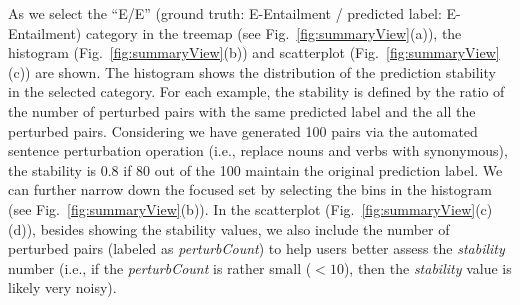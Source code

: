 As we select the ``E/E'' (ground truth: E-Entailment / predicted label: E-Entailment) category in the treemap (see Fig.~\ref{fig:summaryView}(a)), the histogram (Fig.~\ref{fig:summaryView}(b)) and scatterplot  (Fig.~\ref{fig:summaryView}(c)) are shown. The histogram shows the distribution of the prediction stability in the selected category. For each example, the stability is defined by the ratio of the number of perturbed pairs with the same predicted label and the all the perturbed pairs. Considering we have generated 100 pairs via the automated sentence perturbation operation (i.e., replace nouns and verbs with synonymous), the stability is 0.8 if 80 out of the 100 maintain the original prediction label. 
%
We can further narrow down the focused set by selecting the bins in the histogram (see Fig.~\ref{fig:summaryView}(b)).
%
In the scatterplot (Fig.~\ref{fig:summaryView}(c)(d)), besides showing the stability values, we also include the number of perturbed pairs (labeled as \emph{perturbCount}) to help users better assess the \emph{stability} number (i.e., if the \emph{perturbCount} is rather small ($<10$), then the \emph{stability} value is likely very noisy). %



